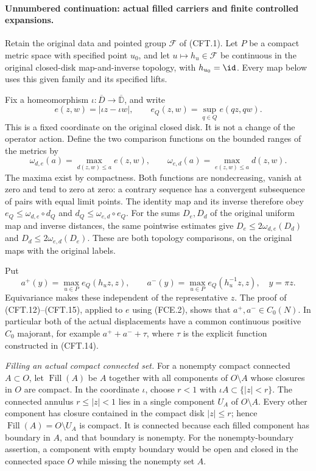 \paragraph{Unnumbered continuation: actual filled carriers and finite controlled expansions.}
Retain the original data and pointed group $\mathscr F$ of
(CFT.1). Let $P$ be a compact metric space with specified point
$u_0$, and let $u\mapsto h_u\in\mathscr F$ be continuous in
the original closed-disk map-and-inverse topology, with
$h_{u_0}=\id$. Every map below uses this given family and its
specified lifts.

Fix a homeomorphism $\iota:\overline D\to\overline{\mathbb D}$,
and write
\[
 e(z,w)=|\iota z-\iota w|,\qquad
 e_Q(z,w)=\sup_{q\in Q}e(qz,qw).
                                                               \tag{FCE.1}
\]
This is a fixed coordinate on the original closed disk. It is
not a change of the operator action. Define the two comparison
functions on the bounded ranges of the metrics by
\[
 \omega_{d,e}(a)=\max_{d(z,w)\leq a}e(z,w),\qquad
 \omega_{e,d}(a)=\max_{e(z,w)\leq a}d(z,w).
                                                               \tag{FCE.2}
\]
The maxima exist by compactness. Both functions are nondecreasing,
vanish at zero and tend to zero at zero: a contrary sequence has
a convergent subsequence of pairs with equal limit points. The
identity map and its inverse therefore obey
$e_Q\leq\omega_{d,e}\circ d_Q$ and
$d_Q\leq\omega_{e,d}\circ e_Q$. For the sums $D_e,D_d$ of
the original uniform map and inverse distances, the same
pointwise estimates give
$D_e\leq2\omega_{d,e}(D_d)$ and
$D_d\leq2\omega_{e,d}(D_e)$. These are both topology
comparisons, on the original maps with the original labels.

Put
\[
 a^+(y)=\max_{u\in P}e_Q(h_uz,z),\qquad
 a^-(y)=\max_{u\in P}e_Q(h_u^{-1}z,z),\quad y=\pi z.
                                                               \tag{FCE.3}
\]
Equivariance makes these independent of the representative $z$.
The proof of (CFT.12)--(CFT.15), applied to $e$ using (FCE.2),
shows that $a^+,a^-\in C_0(N)$. In particular both of the
actual displacements have a common continuous positive
$C_0$ majorant, for example $a^++a^-+\tau$, where $\tau$
is the explicit function constructed in (CFT.14).

\emph{Filling an actual compact connected set.}
For a nonempty compact connected $A\subset O$, let
$\operatorname{Fill}(A)$ be $A$ together with all components
of $O\setminus A$ whose closures in $O$ are compact.
In the coordinate $\iota$, choose $r<1$ with
$\iota A\subset\{|z|<r\}$. The connected annulus
$r\leq|z|<1$ lies in a single component $U_A$ of
$O\setminus A$. Every other component has closure contained
in the compact disk $|z|\leq r$; hence
$\operatorname{Fill}(A)=O\setminus U_A$ is compact.
It is connected because each filled component has boundary
in $A$, and that boundary is nonempty. For the nonempty-boundary
assertion, a component with empty boundary would be open and
closed in the connected space $O$ while missing the nonempty
set $A$.

